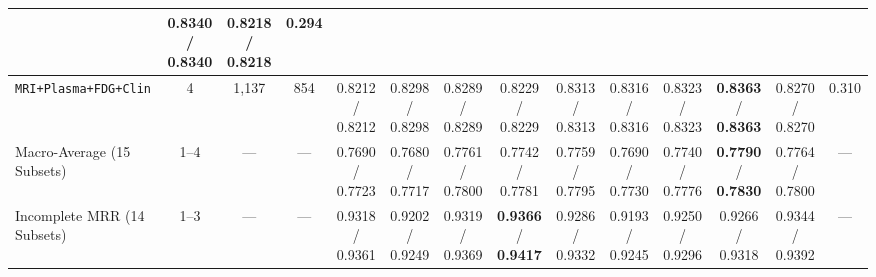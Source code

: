 \documentclass[10pt,twocolumn]{article}
\begin{document}
\begin{table}[t]
{\begin{tabular}{@{}>{\raggedright\arraybackslash}p{2.65cm}ccccccccccccc@{}}
\shortstack{0.8305 /\\0.8305} & \shortstack{0.8340 /\\0.8340} &
\shortstack{0.8218 /\\0.8218} & 0.294 \\
\midrule
\texttt{MRI+Plasma+FDG+Clin} & 4 & 1,137 & 854 & \shortstack{0.8212 /\\0.8212} &
\shortstack{0.8298 /\\0.8298} & \shortstack{0.8289 /\\0.8289} & \shortstack{0.8229 /\\0.8229} &
\shortstack{0.8313 /\\0.8313} & \shortstack{0.8316 /\\0.8316} & \shortstack{0.8323 /\\0.8323} &
\shortstack{\textbf{0.8363} /\\\textbf{0.8363}} & \shortstack{0.8270 /\\0.8270} & 0.310 \\
\midrule
Macro-Average (15 Subsets) & 1--4 & --- & --- & \shortstack{0.7690 /\\0.7723} &
\shortstack{0.7680 /\\0.7717} & \shortstack{0.7761 /\\0.7800} & \shortstack{0.7742 /\\0.7781} &
\shortstack{0.7759 /\\0.7795} & \shortstack{0.7690 /\\0.7730} & \shortstack{0.7740 /\\0.7776} &
\shortstack{\textbf{0.7790} /\\\textbf{0.7830}} & \shortstack{0.7764 /\\0.7800} & --- \\
Incomplete MRR (14 Subsets) & 1--3 & --- & --- & \shortstack{0.9318 /\\0.9361} &
\shortstack{0.9202 /\\0.9249} & \shortstack{0.9319 /\\0.9369} &
\shortstack{\textbf{0.9366} /\\\textbf{0.9417}} & \shortstack{0.9286 /\\0.9332} &
\shortstack{0.9193 /\\0.9245} & \shortstack{0.9250 /\\0.9296} & \shortstack{0.9266 /\\0.9318} &
\shortstack{0.9344 /\\0.9392} & --- \\
\bottomrule
\end{tabular}%
}
\end{table}
\end{document}
